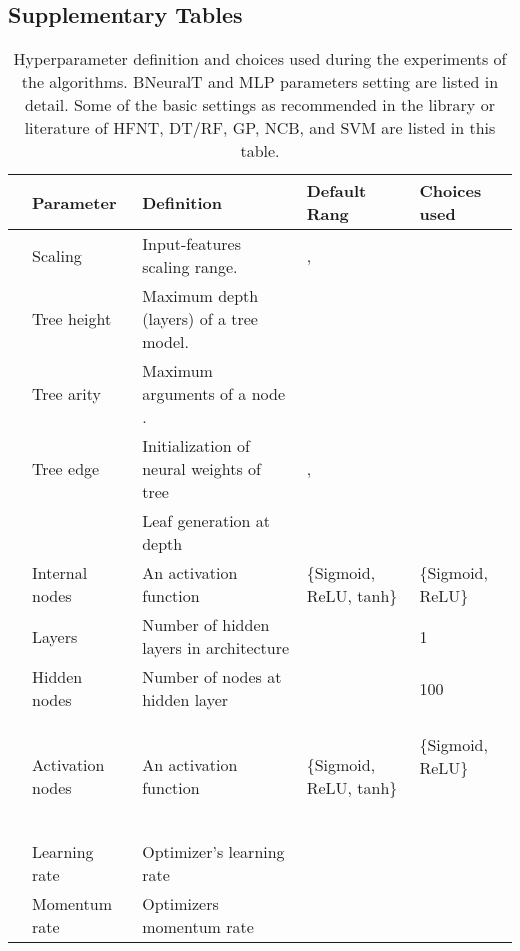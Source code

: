 \documentclass[11pt,a4paper]{article}
\begin{document}
    \subsection{Supplementary Tables}
    \label{sec:results_table_other}
    \begin{table}[H]
        \centering
        \footnotesize 		
        \caption{Hyperparameter definition and choices used during the experiments of the algorithms. BNeuralT and MLP parameters setting are listed in detail. Some of the  basic settings as recommended in the library or literature of HFNT, DT/RF, GP, NCB, and SVM are listed in this table.}
        \label{tab:parameters}
        \renewcommand{\arraystretch}{1.2}
        \setlength{\tabcolsep}{0.1cm}
        \begin{tabular}{llp{6cm}p{3.5cm}l}
            \toprule
            & Parameter & Definition & Default Rang &  Choices used \\
            \midrule
            \parbox[t]{3mm}{}
            & Scaling & Input-features scaling range. & , &  \\	
            & Tree height & Maximum depth (layers) of a tree model. &   &  \\			
            & Tree arity  & Maximum arguments of a node . &   &  \\			
            & Tree edge  & Initialization of neural weights of tree &  ,    &  \\			
            &  & Leaf generation at depth  &  & \\
            & Internal nodes  & An activation function & \parbox[t]{3.5cm}{\raggedright \{Sigmoid, ReLU, tanh\} } &\parbox[t]{2.5cm}{\raggedright \{Sigmoid, ReLU\} }\\
            \parbox[t]{3mm}{}	
            & Layers  & Number of hidden layers in  architecture &  & 1\\
            & Hidden nodes  & Number of nodes at hidden layer &  & 100\\
            & Activation nodes  & An activation function & \parbox[t]{3.5cm}{\raggedright \{Sigmoid, ReLU, tanh\}}& \parbox[t]{2.5cm}{\raggedright \{Sigmoid, ReLU\} }\ \\
            \parbox[t]{3mm}{}
            & Learning rate & Optimizer's learning rate &  & \\
& Momentum rate & Optimizers momentum rate &  & \\

\end{tabular}
\end{table}
\end{document}
